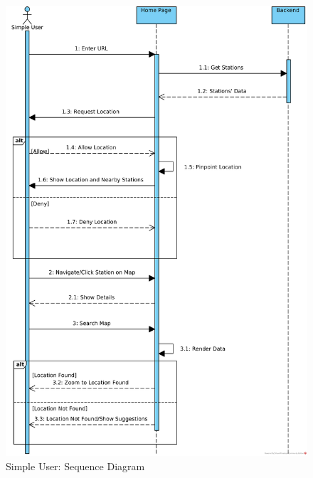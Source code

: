 \begin{figure}[H]
    \centering
    \includegraphics[height=0.9\textheight]{media/Sequence/Simple_User.png}
	\caption{Simple User: Sequence Diagram}
	\label{fig:Simple_User_Sequence}
\end{figure}

